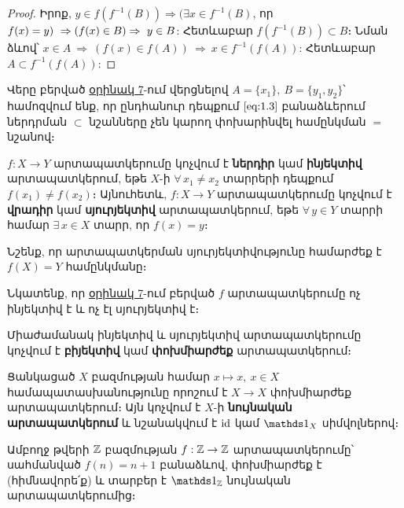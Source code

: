 \documentclass[./main.tex]{subfiles}
\begin{document}
\label{թեորեմ 1:3}
\begin{proof}
Իրոք, $y\in f(f^{-1} (B))\Rightarrow (\exists x\in f^{-1} (B)$, որ $f(x)=y) \ \Rightarrow {(f(x)\in B)} \\ \Rightarrow \ y\in B$: Հետևաբար $f(f^{-1} (B))\subset B$։ Նման ձևով՝ $x\in A \ \Rightarrow \ (f(x)\in f(A)) \ \Rightarrow \ x\in f^{-1} (f(A))$: Հետևաբար $A\subset f^{-1} (f(A))$:
\end{proof}
\par Վերը բերված \hyperref[ch1ex7]{օրինակ 7}-ում վերցնելով $A=\{x_1\},\ 
B=\{y_1,y_2\}$՝ համոզվում ենք, որ ընդհանուր դեպքում $\eqref{eq:1.3}$ բանաձևերում ներդրման $\subset$ նշանները չեն կարող փոխարինվել համընկման $=$ նշանով։
\begin{definition}
$f:X\rightarrow Y$ արտապատկերումը կոչվում է \textbf{ներդիր} կամ \textbf{ինյեկտիվ} արտա\-պատ\-կերում, եթե $X$-ի $\forall\, x_1\neq x_2$ տարրերի դեպքում $f(x_1)\neq f(x_2)$։ Այնուհետև, $f:X\rightarrow Y$ արտապատկերումը կոչվում է \textbf{վրադիր} կամ \textbf{սյուրյեկտիվ} արտա\-պատ\-կե\-րում, եթե $\forall\, y\in Y$ տարրի համար $\exists\, x \in X$ տարր, որ $f(x)=y$։
\end{definition}
\par Նշենք, որ արտապատկերման սյուրյեկտիվությունը համարժեք է $f(X)=Y$ համընկմանը։
\par Նկատենք, որ \hyperref[ch1ex7]{օրինակ 7}-ում բերված $f$ արտապատկերումը ոչ ինյեկտիվ է և ոչ էլ սյուրյեկտիվ է։
\par
Միաժամանակ ինյեկտիվ և սյուրյեկտիվ արտապատկերումը կոչվում է \textbf{բիյեկտիվ} կամ \textbf{փոխմիարժեք} արտապատկերում։
\par Ցանկացած $X$ բազմության համար $x\mapsto x,\ x\in X$ համապատասխանությունը որոշում է $X\rightarrow X$ փոխմիարժեք արտապատկերում։ Այն կոչվում է $X$-ի \textbf{նույնական արտապատկերում} և նշանակվում է $\operatorname{id}$ կամ $\nuynakan_X$ սիմվոլներով։

\begin{example}\label{ch1ex8}
Ամբողջ թվերի $\mathbb{Z}$ բազմության $f : \mathbb{Z} \rightarrow \mathbb{Z}$ արտապատկերումը՝ սահմանված $f(n)=n+1$ բանաձևով, փոխմիարժեք է (հիմնավորե՛ք) և տարբեր է $\nuynakan_\Z$ նույնական արտապատկերումից։
\end{example}
\end{document}
